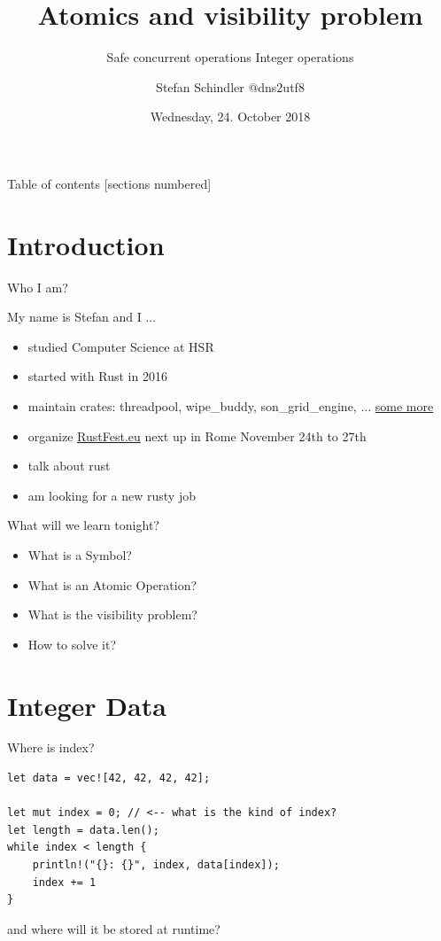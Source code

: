 \documentclass[10pt]{beamer}
\title{Atomics and visibility problem}
\subtitle{Safe concurrent operations Integer operations}
\date{Wednesday, 24. October 2018}
\author{Stefan Schindler @dns2utf8}
\institute{\href{https://www.meetup.com/de-DE/Rust-Zurich/}{Rust Zürichsee Meetup} hosted by \href{https://coredump.ch}{coredump.ch}}
\begin{document}
\maketitle

\begin{frame}{Table of contents}
  [sections numbered]
  \tableofcontents[hideallsubsections]
\end{frame}

\section{Introduction}

\begin{frame}[fragile]{Who I am?}

My name is Stefan and I ...

\begin{itemize}
\item studied Computer Science at HSR
\item started with Rust in 2016
\item maintain crates: threadpool, wipe\_buddy, son\_grid\_engine, ... \href{https://crates.io/users/dns2utf8}{some more}
\item organize \href{https://rustfest.eu}{RustFest.eu} next up in Rome November 24th to 27th
\item talk about rust
\item am looking for a new rusty job
\end{itemize}

\end{frame}
\begin{frame}{What will we learn tonight?}
  
\begin{itemize}
\item What is a Symbol?
\item What is an Atomic Operation?
\item What is the visibility problem?
\item How to solve it?
\end{itemize}
\end{frame}

\section{Integer Data}

\begin{frame}[fragile]{Where is index?}

\begin{verbatim}
let data = vec![42, 42, 42, 42];

let mut index = 0; // <-- what is the kind of index?
let length = data.len();
while index < length {
    println!("{}: {}", index, data[index]);
    index += 1
}
\end{verbatim}
and \alert{where} will it be stored at runtime?
\end{frame}
\end{document}
